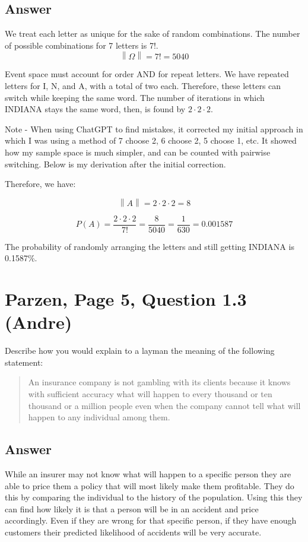 \documentclass[11pt]{article}
\begin{document}
\subsection*{Answer}

We treat each letter as unique for the sake of random combinations.
The number of possible combinations for 7 letters is 7!.
\[\left\|\Omega\right\| = 7! = 5040\]

Event space must account for order AND for repeat letters.
We have repeated letters for I, N, and A, with a total of two each.
Therefore, these letters can switch while keeping the same word.
The number of iterations in which INDIANA stays the same word, then, is 
found by \(2 \cdot 2 \cdot 2\). 

Note - When using ChatGPT to find mistakes, it corrected my initial approach 
in which I was using a method of 7 choose 2, 
6 choose 2, 5 choose 1, etc. 
It showed how my sample space is much simpler, and can be counted with pairwise switching.
Below is my derivation after the initial correction.


Therefore, we have:

\[
\left\|A\right\| = 
2 \cdot 2 \cdot 2 =
8
\]

\[
P(A) = 
\frac{2 \cdot 2 \cdot 2}{7!} =
\frac{8}{5040} = 
\frac{1}{630} = 
0.001587
\]

The probability of randomly arranging the letters and still getting 
INDIANA is 0.1587\%.


\section*{Parzen, Page 5, Question 1.3 (Andre)}

Describe how you would explain to a layman the meaning of the following statement:

\begin{quote}
    An insurance company is not gambling with its clients because it knows with sufficient accuracy 
    what will happen to every thousand or ten thousand or a million people even when the company 
    cannot tell what will happen to any individual among them.
\end{quote}

\subsection*{Answer}

While an insurer may not know what will happen to a specific person they are able to price them a policy that will most likely make them profitable. They do this by comparing the individual to the history of the population. Using this they can find how likely it is that a person will be in an accident and price accordingly. Even if they are wrong for that specific person, if they have enough customers their predicted likelihood of accidents will be very accurate. 
\end{document}
